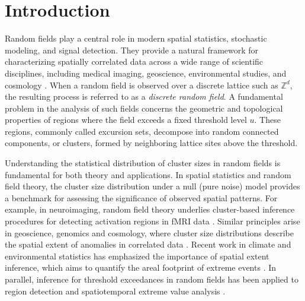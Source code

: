 \documentclass[aap,preprint]{imsart}
\theoremstyle{plain}
\theoremstyle{definition}
\def\Z{{\mathbb Z}}
\begin{document}
\begin{frontmatter}
		\begin{keyword}[class=MSC]
		\end{keyword}
		
		\begin{keyword}
		\end{keyword}
		
	\end{frontmatter}
	
	\section{Introduction}	
	Random fields play a central role in modern spatial statistics, stochastic modeling, and signal detection. They provide a natural framework for characterizing spatially correlated data across a wide range of scientific disciplines, including medical imaging, geoscience, environmental studies, and cosmology \cite{AT07,Cheng:2020,Chiles:2012,Goeman:2023,MP11,Taylor:2007}.
	When a random field is observed over a discrete lattice such as $\Z^d$, the resulting process is referred to as a \textit{discrete random field}. A fundamental problem in the analysis of such fields concerns the geometric and topological properties of regions where the field exceeds a fixed threshold level 
	$u$. These regions, commonly called excursion sets, decompose into random connected components, or clusters, formed by neighboring lattice sites above the threshold.
	
	Understanding the statistical distribution of cluster sizes in random fields is fundamental for both theory and applications. In spatial statistics and random field theory, the cluster size distribution under a null (pure noise) model provides a benchmark for assessing the significance of observed spatial patterns. For example, in neuroimaging, random field theory underlies cluster-based inference procedures for detecting activation regions in fMRI data \cite{Bansal:2018,Chumbley:2010,Friston:1994,Goeman:2023,Poline:1997,Worsley:1996a,Zhang:2009}. Similar principles arise in geoscience, genomics and cosmology, where cluster size distributions describe the spatial extent of anomalies in correlated data  \cite{Adler81,Bardeen:1985,Benjamini:2019,Lindgren82,Vanmercke:2010}. Recent work in climate and environmental statistics has emphasized the importance of spatial extent inference, which aims to quantify the areal footprint of extreme events \cite{Tan:2021,Zhong:2025}. In parallel, inference for threshold exceedances in random fields has been applied to region detection \cite{Benjamini:2019} and spatiotemporal extreme value analysis \cite{Fondeville:2018,Huser:2014}. 
	
\end{document}
